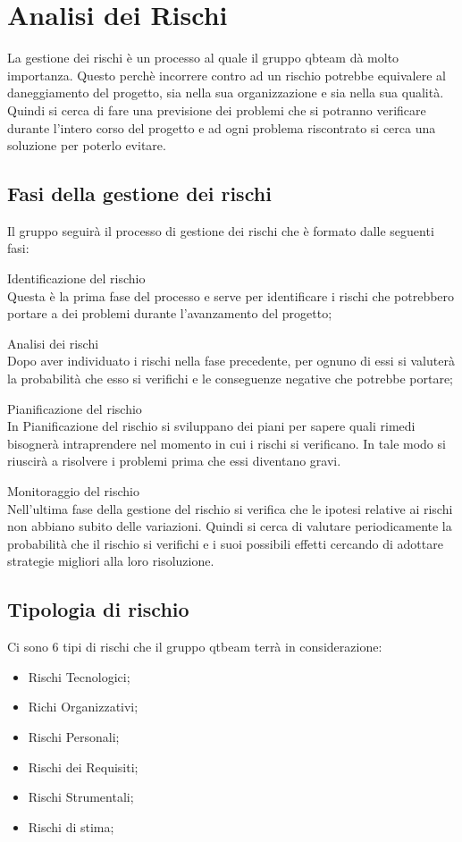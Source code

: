 \section{Analisi dei Rischi}
La gestione dei rischi è un processo al quale il gruppo qbteam dà molto importanza. Questo perchè incorrere contro ad un rischio potrebbe equivalere al daneggiamento del progetto, sia nella sua organizzazione e sia nella sua qualità.
Quindi si cerca di fare una previsione dei problemi che si potranno verificare durante l'intero corso del progetto e ad ogni problema riscontrato si cerca una soluzione per poterlo evitare.

\subsection{Fasi della gestione dei rischi}
Il gruppo seguirà il processo di gestione dei rischi che è formato dalle seguenti fasi:
\item Identificazione del rischio 
\\ Questa è la prima fase del processo e serve per identificare i rischi che potrebbero portare a dei problemi durante l'avanzamento del progetto; 
\item Analisi dei rischi 
\\ Dopo aver individuato i rischi nella fase precedente, per ognuno di essi si valuterà la probabilità che esso si verifichi e le conseguenze negative che potrebbe portare;
\item Pianificazione del rischio 
\\ In Pianificazione del rischio si sviluppano dei piani per sapere quali rimedi bisognerà intraprendere nel momento in cui i rischi si verificano. In tale modo si riuscirà a risolvere i problemi prima che essi diventano gravi.
\item Monitoraggio del rischio 
\\ Nell'ultima fase della gestione del rischio si verifica che le ipotesi relative ai rischi non abbiano subito delle variazioni. Quindi si cerca di valutare periodicamente la probabilità che il rischio si verifichi e i suoi possibili effetti cercando di adottare strategie migliori alla loro risoluzione.

\subsection{Tipologia di rischio}
Ci sono 6 tipi di rischi che il gruppo qtbeam terrà in considerazione:
\begin{itemize}
	\item Rischi Tecnologici;
	\item Richi Organizzativi;
	\item Rischi Personali;
	\item Rischi dei Requisiti;
	\item Rischi Strumentali;
	\item Rischi di stima;
\end{itemize}


